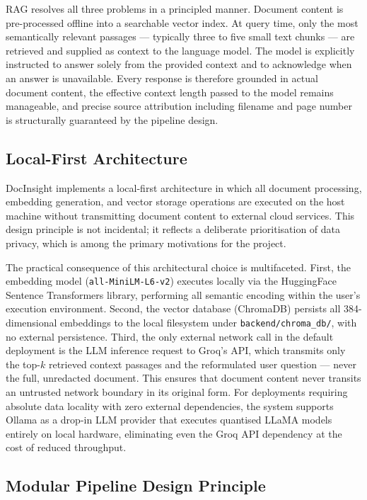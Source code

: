 RAG resolves all three problems in a principled manner. Document content is pre-processed offline into a searchable vector index. At query time, only the most semantically relevant passages --- typically three to five small text chunks --- are retrieved and supplied as context to the language model. The model is explicitly instructed to answer solely from the provided context and to acknowledge when an answer is unavailable. Every response is therefore grounded in actual document content, the effective context length passed to the model remains manageable, and precise source attribution including filename and page number is structurally guaranteed by the pipeline design.

\subsection{Local-First Architecture}

DocInsight implements a local-first architecture in which all document processing, embedding generation, and vector storage operations are executed on the host machine without transmitting document content to external cloud services. This design principle is not incidental; it reflects a deliberate prioritisation of data privacy, which is among the primary motivations for the project.

The practical consequence of this architectural choice is multifaceted. First, the embedding model (\texttt{all-MiniLM-L6-v2}) executes locally via the HuggingFace Sentence Transformers library, performing all semantic encoding within the user's execution environment. Second, the vector database (ChromaDB) persists all 384-dimensional embeddings to the local filesystem under \texttt{backend/chroma\_db/}, with no external persistence. Third, the only external network call in the default deployment is the LLM inference request to Groq's API, which transmits only the top-$k$ retrieved context passages and the reformulated user question --- never the full, unredacted document. This ensures that document content never transits an untrusted network boundary in its original form. For deployments requiring absolute data locality with zero external dependencies, the system supports Ollama as a drop-in LLM provider that executes quantised LLaMA models entirely on local hardware, eliminating even the Groq API dependency at the cost of reduced throughput.

\subsection{Modular Pipeline Design Principle}

